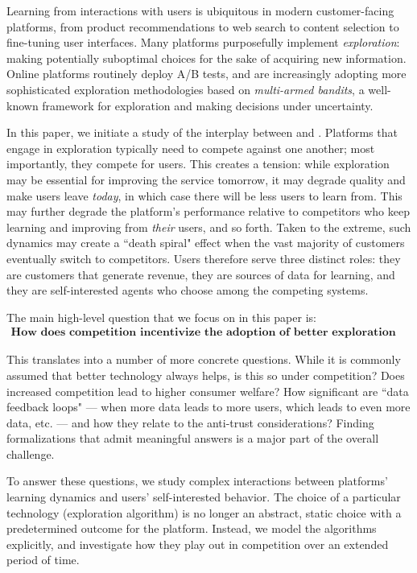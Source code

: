 
Learning from interactions with users is ubiquitous in modern customer-facing platforms, from product recommendations to web search to content selection to fine-tuning user interfaces. Many platforms purposefully implement \emph{exploration}: making potentially suboptimal choices for the sake of acquiring new information.
Online platforms routinely deploy A/B tests, and are increasingly adopting  more sophisticated exploration methodologies based on \emph{multi-armed bandits}, a well-known framework for exploration and making decisions under uncertainty.



In this paper, we initiate a study of the interplay between \exploration and \competition. Platforms that engage in exploration typically need to compete against one another; most importantly, they compete for users. This creates a tension:
while exploration may be essential for improving the service tomorrow, it may degrade quality and make users leave \emph{today}, in which case there will be less users to learn from. This may further degrade the platform's performance relative to competitors who keep learning and improving from \emph{their} users, and so forth. Taken to the extreme, such dynamics may create a ``death spiral" effect when the vast majority of customers eventually switch to competitors. Users therefore serve three distinct roles: they are customers that generate revenue, they are sources of data for learning, and they are self-interested agents who choose among the competing systems.

The main high-level question that we focus on in this paper is:
\begin{align}\label{eq:main-Q}
\textbf{How does competition incentivize the adoption of better exploration algorithms?}
\end{align}

\noindent This translates into a number of more concrete questions. While it is commonly assumed that better technology always helps, is this so under competition? Does increased competition lead to higher consumer welfare? How significant are ``data feedback loops" --- when more data leads to more users, which leads to even more data, etc. --- and how they relate to the anti-trust considerations? Finding formalizations that admit meaningful answers is a major part of the overall challenge.




To answer these questions, we study complex interactions between platforms' learning dynamics and users' self-interested behavior. The choice of a particular technology (exploration algorithm) is no longer an abstract, static choice with a predetermined outcome for the platform. Instead, we model the algorithms explicitly, and investigate how they play out in competition over an extended period of time.


